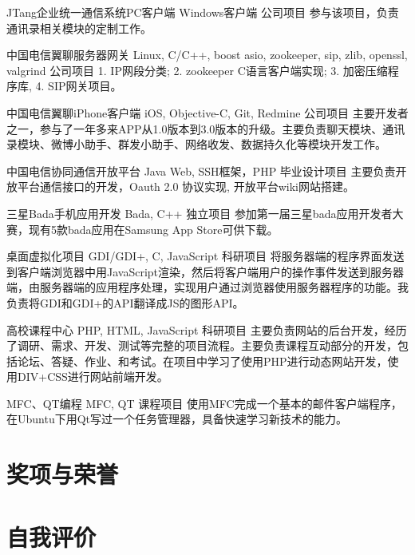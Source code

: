 \documentclass[11pt,a4paper]{moderncv}
\begin{document}
\vspace*{0.2\baselineskip}
{JTang企业统一通信系统PC客户端}
{Windows客户端}
{公司项目}{}
{参与该项目，负责通讯录相关模块的定制工作。}

\vspace*{0.2\baselineskip}
{中国电信翼聊服务器网关}
{Linux, C/C++, boost asio, zookeeper, sip, zlib, openssl, valgrind}
{公司项目}{}
{1. IP网段分类; 2. zookeeper C语言客户端实现; 3. 加密压缩程序库, 4. SIP网关项目。}

\vspace*{0.2\baselineskip}
{中国电信翼聊iPhone客户端}
{iOS, Objective-C, Git, Redmine}
{公司项目}{}
{主要开发者之一，参与了一年多来APP从1.0版本到3.0版本的升级。主要负责聊天模块、通讯录模块、微博小助手、群发小助手、网络收发、数据持久化等模块开发工作。}

\vspace*{0.2\baselineskip}
{中国电信协同通信开放平台}
{Java Web, SSH框架，PHP}
{毕业设计项目}{}
{主要负责开放平台通信接口的开发，Oauth 2.0 协议实现, 开放平台wiki网站搭建。}

\vspace*{0.2\baselineskip}
{三星Bada手机应用开发}
{Bada, C++}
{独立项目}{}
{参加第一届三星bada应用开发者大赛，现有5款bada应用在Samsung App Store可供下载。}

\vspace*{0.2\baselineskip}
{桌面虚拟化项目}
{GDI/GDI+, C, JavaScript}
{科研项目}{}
{将服务器端的程序界面发送到客户端浏览器中用JavaScript渲染，然后将客户端用户的操作事件发送到服务器端，由服务器端的应用程序处理，实现用户通过浏览器使用服务器程序的功能。我负责将GDI和GDI+的API翻译成JS的图形API。}

\vspace*{0.2\baselineskip}
{高校课程中心}
{PHP, HTML, JavaScript}
{科研项目}{}
{主要负责网站的后台开发，经历了调研、需求、开发、测试等完整的项目流程。主要负责课程互动部分的开发，包括论坛、答疑、作业、和考试。在项目中学习了使用PHP进行动态网站开发，使用DIV+CSS进行网站前端开发。}

\vspace*{0.2\baselineskip}
{MFC、QT编程}
{MFC, QT}
{课程项目}{}
{使用MFC完成一个基本的邮件客户端程序，在Ubuntu下用Qt写过一个任务管理器，具备快速学习新技术的能力。}

\renewcommand{\baselinestretch}{1.0}

\section{奖项与荣誉}

\section{自我评价}

\closesection{}                   %
\renewcommand{\listitemsymbol}{-} %
\end{document}
